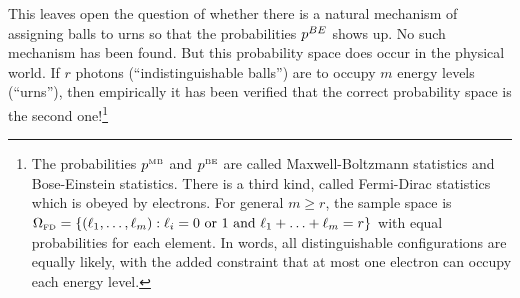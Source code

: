 \documentclass[preprint,  11pt]{amsart}
\def\omeg{\underline{\ome}}
\renewcommand{\benu}{\begin{enumerate}\setlength\itemsep{6pt}}
\begin{document}
\begin{example}
This leaves open the question of whether there is a natural mechanism of assigning balls to urns so that the probabilities $p^{\tiny BE}$ shows up. No such mechanism has been found. But this probability space does occur in the physical world. If $r$ photons (``indistinguishable balls'') are to occupy $m$ energy levels (``urns''), then empirically it has been verified that the correct probability space is the second one!\footnote{The probabilities $p^{\mbox{\tiny MB}}$ and $p^{\mbox{\tiny BE}}$ are called Maxwell-Boltzmann statistics and Bose-Einstein statistics. There is a third kind, called Fermi-Dirac statistics which is obeyed by electrons. For general $m\ge r$,  the sample space is $\Omega_{\mbox{\tiny FD}}=\{(\ell_{1},\ldots ,\ell_{m}){\; : \;} \ell_{i}=0 \mbox{ or }1 \mbox{ and }\ell_{1}+\ldots +\ell_{m}=r\}$ with equal probabilities for each element. In words, all distinguishable configurations are equally likely, with the added constraint that at most one electron can occupy each energy level.}
\end{example}




\end{document}
